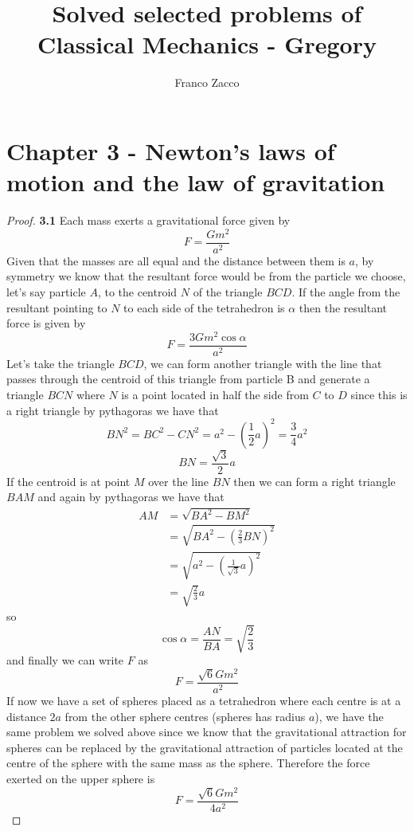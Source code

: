 \documentclass[11pt]{article}
\title{\textbf{Solved selected problems of Classical Mechanics - Gregory}}
\author{Franco Zacco}
\date{}
\begin{document}
\maketitle
\thispagestyle{empty}

\section*{Chapter 3 - Newton's laws of motion and the law of gravitation}

	\begin{proof}{\textbf{3.1}}
        Each mass exerts a gravitational force given by
        $$F = \frac{Gm^2}{a^2}$$
        Given that the masses are all equal and the distance between them is
        $a$, by symmetry we know that the resultant force would be from
        the particle we choose, let's say particle $A$, to the centroid $N$ of the 
        triangle $BCD$. If the angle from the resultant pointing to $N$ to each side of
        the tetrahedron is $\alpha$ then the resultant force is given by
        $$F = \frac{3Gm^2\cos{\alpha}}{a^2}$$
        Let's take the triangle $BCD$, we can form another triangle with the
        line that passes through the centroid of this triangle from particle B
        and generate a triangle $BCN$ where $N$ is a point located in half the
        side from $C$ to $D$ since this is a right triangle by pythagoras we
        have that
        $$BN^2 = BC^2 - CN^2 = a^2 - ( \frac{1}{2}a)^2 = \frac{3}{4}a^2$$
        $$BN = \frac{\sqrt{3}}{2}a$$
        If the centroid is at point $M$ over the line $BN$ then we can
        form a right triangle $BAM$ and again by pythagoras we have that
        \begin{align*}
        AM &= \sqrt{BA^2 - BM^2} \\
           &= \sqrt{BA^2 - (\frac{2}{3}BN)^2} \\
           &= \sqrt{a^2 - (\frac{1}{\sqrt{3}}a)^2} \\
           &= \sqrt{\frac{2}{3}}a
        \end{align*}
        so
        $$\cos{\alpha} = \frac{AN}{BA} = \sqrt{\frac{2}{3}}$$
        and finally we can write $F$ as
        $$F = \frac{\sqrt{6}Gm^2}{a^2}$$
        If now we have a set of spheres placed as a tetrahedron where each centre
        is at a distance $2a$ from the other sphere centres (spheres has radius
        $a$), we have the same problem we solved above since we know that the
        gravitational attraction for spheres can be replaced by the
        gravitational attraction of particles located at the centre of the
        sphere with the same mass as the sphere. Therefore the force exerted on
        the upper sphere is
        $$F = \frac{\sqrt{6}Gm^2}{4a^2}$$
    \end{proof}
\end{document}
